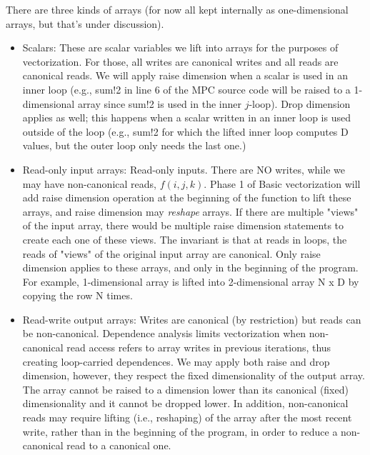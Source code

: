\documentclass[sigconf, screen, natbib=false, dvipsnames, table]{acmart}
\theoremstyle{definition}
\begin{document}
There are three kinds of arrays (for now all kept internally as one-dimensional arrays, but that's under discussion).
\begin{itemize}

\item Scalars: These are scalar variables we lift into arrays for the purposes of vectorization. 
For those, all writes are canonical writes and all reads are canonical reads. We will apply raise dimension when 
a scalar is used in an inner loop (e.g., {\sf sum!2} in line 6 of the MPC source code will be raised to a 1-dimensional 
array since {\sf sum!2} is used in the inner $j$-loop). Drop dimension applies as well; this happens when a scalar
written in an inner loop is used outside of the loop (e.g., {\sf sum!2} for which the lifted inner loop computes 
{\sf D} values, but the outer loop only needs the last one.)

\item Read-only input arrays: Read-only inputs. There are NO writes, while we may have non-canonical reads, $f(i,j,k)$. 
Phase 1 of Basic vectorization will add raise dimension operation at the beginning of the function to lift these arrays, 
and raise dimension may \emph{reshape} arrays. If there are multiple "views" of the input array, there would be multiple raise dimension statements to create
each one of these views. The invariant is that at reads in loops, the reads of "views" of the original input array are canonical.
Only raise dimension applies to these arrays, and only in the beginning of the program. For example, 1-dimensional array 
 is lifted into 2-dimensional array {\sf N x D} by copying the row {\sf N} times. 
 
 \item Read-write output arrays: Writes are canonical (by restriction) but reads can be non-canonical. 
 Dependence analysis limits vectorization when non-canonical read access refers to array writes in
 previous iterations, thus creating loop-carried dependences. We may apply both raise and drop dimension, however, 
 they respect the fixed dimensionality of the output array. The array cannot be raised to a dimension lower than
 its canonical (fixed) dimensionality and it cannot be dropped lower. In addition, non-canonical reads may 
 require lifting (i.e., reshaping) of the array after the most recent write, rather than in the beginning of the program, 
 in order to reduce a non-canonical read to a canonical one. 

\end{itemize}
\end{document}
